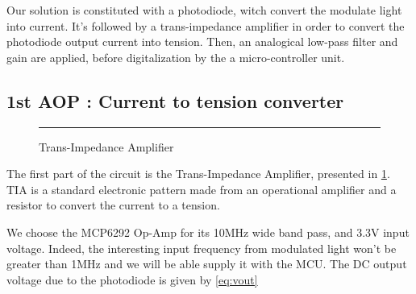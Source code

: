 Our solution is constituted with a photodiode, witch convert the modulate light into current. It's followed by a trans-impedance amplifier in order to convert the photodiode output current into tension. Then, an analogical low-pass filter and gain are applied, before digitalization by the a micro-controller unit.

\subsection{1st AOP : Current to tension converter}

\begin{figure}[htbp]
    \centering
    \rule{35em}{0.5pt}    
    \caption{Trans-Impedance Amplifier}
    \label{fig:tia}
\end{figure}

The first part of the circuit is the Trans-Impedance Amplifier, presented in \ref{fig:tia}. TIA is a standard electronic pattern made from an operational amplifier and a resistor to convert the current to a tension.

We choose the MCP6292 Op-Amp for its 10MHz wide band pass, and 3.3V input voltage. Indeed, the interesting input frequency  from modulated light won't be greater than 1MHz and we will be able supply it with the MCU.
The DC output voltage due to the photodiode is given by \ref{eq:vout} 


